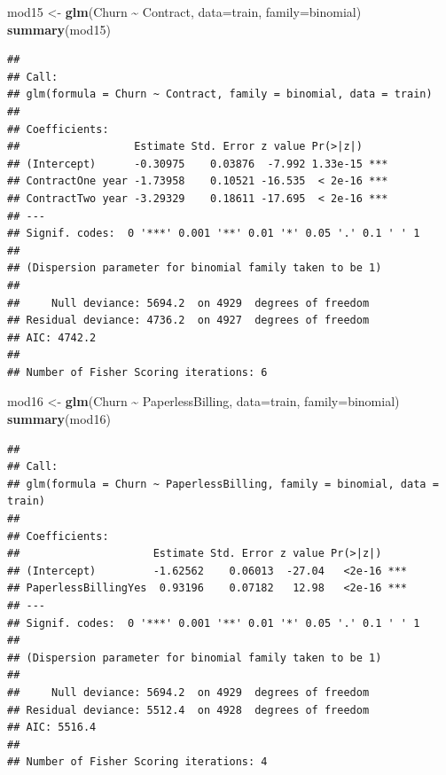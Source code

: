 \documentclass[
  twoside]{article}
\newenvironment{Shaded}{\begin{snugshade}}{\end{snugshade}}
\newcommand{\AttributeTok}[1]{\textcolor[rgb]{0.13,0.29,0.53}{#1}}
\newcommand{\FunctionTok}[1]{\textcolor[rgb]{0.13,0.29,0.53}{\textbf{#1}}}
\newcommand{\NormalTok}[1]{#1}
\newcommand{\OtherTok}[1]{\textcolor[rgb]{0.56,0.35,0.01}{#1}}
\newcommand{\SpecialCharTok}[1]{\textcolor[rgb]{0.81,0.36,0.00}{\textbf{#1}}}
\begin{document}
\begin{Shaded}
\begin{Highlighting}[]
\NormalTok{mod15 }\OtherTok{\textless{}{-}} \FunctionTok{glm}\NormalTok{(Churn }\SpecialCharTok{\textasciitilde{}}\NormalTok{ Contract, }\AttributeTok{data=}\NormalTok{train, }\AttributeTok{family=}\NormalTok{binomial)}
\FunctionTok{summary}\NormalTok{(mod15)}
\end{Highlighting}
\end{Shaded}

\begin{verbatim}
## 
## Call:
## glm(formula = Churn ~ Contract, family = binomial, data = train)
## 
## Coefficients:
##                  Estimate Std. Error z value Pr(>|z|)    
## (Intercept)      -0.30975    0.03876  -7.992 1.33e-15 ***
## ContractOne year -1.73958    0.10521 -16.535  < 2e-16 ***
## ContractTwo year -3.29329    0.18611 -17.695  < 2e-16 ***
## ---
## Signif. codes:  0 '***' 0.001 '**' 0.01 '*' 0.05 '.' 0.1 ' ' 1
## 
## (Dispersion parameter for binomial family taken to be 1)
## 
##     Null deviance: 5694.2  on 4929  degrees of freedom
## Residual deviance: 4736.2  on 4927  degrees of freedom
## AIC: 4742.2
## 
## Number of Fisher Scoring iterations: 6
\end{verbatim}

\begin{Shaded}
\begin{Highlighting}[]
\NormalTok{mod16 }\OtherTok{\textless{}{-}} \FunctionTok{glm}\NormalTok{(Churn }\SpecialCharTok{\textasciitilde{}}\NormalTok{ PaperlessBilling, }\AttributeTok{data=}\NormalTok{train, }\AttributeTok{family=}\NormalTok{binomial)}
\FunctionTok{summary}\NormalTok{(mod16)}
\end{Highlighting}
\end{Shaded}

\begin{verbatim}
## 
## Call:
## glm(formula = Churn ~ PaperlessBilling, family = binomial, data = train)
## 
## Coefficients:
##                     Estimate Std. Error z value Pr(>|z|)    
## (Intercept)         -1.62562    0.06013  -27.04   <2e-16 ***
## PaperlessBillingYes  0.93196    0.07182   12.98   <2e-16 ***
## ---
## Signif. codes:  0 '***' 0.001 '**' 0.01 '*' 0.05 '.' 0.1 ' ' 1
## 
## (Dispersion parameter for binomial family taken to be 1)
## 
##     Null deviance: 5694.2  on 4929  degrees of freedom
## Residual deviance: 5512.4  on 4928  degrees of freedom
## AIC: 5516.4
## 
## Number of Fisher Scoring iterations: 4
\end{verbatim}
\end{document}

